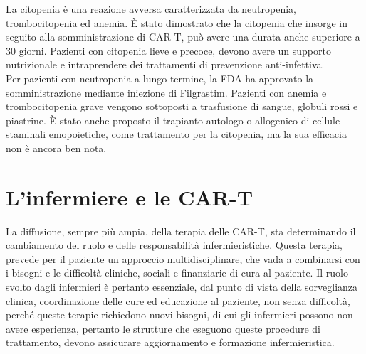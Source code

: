 La citopenia è una reazione avversa caratterizzata da neutropenia, trombocitopenia ed anemia. 
È stato dimostrato che la citopenia che insorge in seguito alla somministrazione di CAR-T, può avere una durata anche 
superiore a 30 giorni\cite{Frontiers}.
Pazienti con citopenia lieve e precoce, devono avere un supporto nutrizionale e intraprendere dei trattamenti di 
prevenzione anti-infettiva.\\ 
Per pazienti con neutropenia a lungo termine, la FDA ha approvato la somministrazione mediante iniezione di Filgrastim. 
Pazienti con anemia e trombocitopenia grave vengono sottoposti a trasfusione di sangue, globuli rossi e piastrine. 
È stato anche proposto il trapianto autologo o allogenico di cellule staminali emopoietiche, come trattamento per 
la citopenia, ma la sua efficacia non è ancora ben nota\cite{Frontiers}.

\section{L’infermiere e le CAR-T}

La diffusione, sempre più ampia, della terapia delle CAR-T, sta determinando il cambiamento del ruolo e delle 
responsabilità infermieristiche. Questa terapia, prevede per il paziente un approccio multidisciplinare, che vada a 
combinarsi con i bisogni e le difficoltà cliniche, sociali e finanziarie di cura al paziente\cite{article2}. Il ruolo svolto dagli 
infermieri è pertanto essenziale, dal punto di vista della sorveglianza clinica, coordinazione delle cure ed 
educazione al paziente, non senza difficoltà, perché queste terapie richiedono nuovi bisogni, di cui gli infermieri 
possono non avere esperienza, pertanto le strutture che eseguono queste procedure di trattamento, 
devono assicurare aggiornamento e formazione infermieristica\cite{article2}.\\

